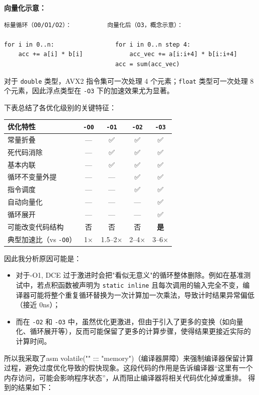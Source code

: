 \documentclass[12pt,fontset=none]{ctexart}
\providecommand{\tightlist}{%
  \setlength{\itemsep}{0pt}\setlength{\parskip}{0pt}}
\newcounter{none}
\begin{document}
\textbf{向量化示意：}

\begin{verbatim}
标量循环（O0/O1/O2）：          向量化后（O3，概念示意）：

for i in 0..n:                 for i in 0..n step 4:
    acc += a[i] * b[i]             acc_vec += a[i:i+4] * b[i:i+4]
                               acc = sum(acc_vec)
\end{verbatim}

对于 \texttt{double} 类型，AVX2 指令集可一次处理 4
个元素；\texttt{float} 类型可一次处理 8 个元素，因此浮点类型在
\texttt{-O3} 下的加速效果尤为显著。

下表总结了各优化级别的关键特征：

{\def\LTcaptype{none} %
\begin{longtable}[]{@{}lcccc@{}}
\toprule\noalign{}
优化特性 & \texttt{-O0} & \texttt{-O1} & \texttt{-O2} & \texttt{-O3} \\
\midrule\noalign{}
\endhead
\bottomrule\noalign{}
\endlastfoot
常量折叠 & --- & ✅ & ✅ & ✅ \\
死代码消除 & --- & ✅ & ✅ & ✅ \\
基本内联 & --- & ✅ & ✅ & ✅ \\
循环不变量外提 & --- & --- & ✅ & ✅ \\
指令调度 & --- & --- & ✅ & ✅ \\
自动向量化 & --- & --- & --- & ✅ \\
循环展开 & --- & --- & --- & ✅ \\
可能改变代码结构 & 否 & 否 & 否 & \textbf{是} \\
典型加速比（vs \texttt{-O0}） & 1× & 1.5--2× & 2--4× & 3--6× \\
\end{longtable}
}

因此我分析原因可能是：

\begin{itemize}
\tightlist
\item
  对于-O1, DCE
  过于激进时会把"看似无意义"的循环整体删除。例如在基准测试中，若点积函数被声明为
  \texttt{static\ inline}
  且每次调用的输入完全不变，编译器可能将整个重复循环替换为一次计算加一次乘法，导致计时结果异常偏低（接近
  0ns）；
\item
  而在 \texttt{-O2} 和 \texttt{-O3}
  中，虽然优化更激进，但由于引入了更多的变换（如向量化、循环展开等），反而可能保留了更多的计算步骤，使得结果更接近实际的计算时间。
\end{itemize}

所以我采取了asm volatile("" :::
"memory")（编译器屏障）来强制编译器保留计算过程，避免过度优化导致的假快现象。这段代码的作用是告诉编译器``这里有一个内存访问，可能会影响程序状态''，从而阻止编译器将相关代码优化掉或重排。
得到的结果如下：
\end{document}

